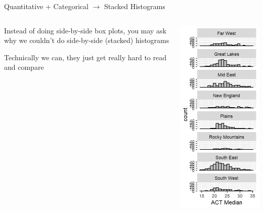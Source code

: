 \documentclass{beamer}
\begin{document}
\begin{frame}{Quantitative + Categorical $\rightarrow$ Stacked Histograms}
\begin{columns}
    \begin{column}{0.45\textwidth}
        Instead of doing side-by-side box plots, you may ask why we couldn't do side-by-side (stacked) histograms \vspace{10mm}

        Technically we can, they just get really hard to read and compare
    \end{column}

    \begin{column}{0.45\textwidth}
           \includegraphics[scale=0.65]{img/stacked_histograms.jpeg}
    \end{column}
\end{columns}
\end{frame}
\end{document}
